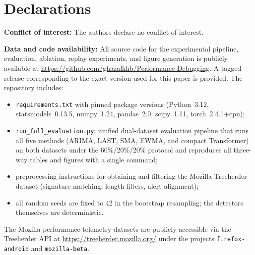 \documentclass[pdflatex,sn-nature]{sn-jnl}
\theoremstyle{thmstyleone}%
\begin{document}
\section*{Declarations}
\textbf{Conflict of interest:}
The authors declare no conflict of interest.

\noindent\textbf{Data and code availability:}
All source code for the experimental pipeline, evaluation, ablation, replay
experiments, and figure generation is publicly available at
\url{https://github.com/ghazalkhb/Performance-Debugging}.
A tagged release corresponding to the exact version used for this paper is
provided.
The repository includes:
\begin{itemize}
  \item \texttt{requirements.txt} with pinned package versions
    (Python~3.12, statsmodels~0.13.5, numpy~1.24, pandas~2.0, scipy~1.11,
     torch~2.4.1+cpu);
  \item \texttt{run\_full\_evaluation.py}: unified dual-dataset evaluation
    pipeline that runs all five methods (ARIMA, LAST, SMA, EWMA, and
    compact Transformer) on both datasets under the 60\%/20\%/20\% protocol
    and reproduces all three-way tables and figures with a single command;
  \item preprocessing instructions for obtaining and filtering the Mozilla
    Treeherder dataset (signature matching, length filters, alert alignment);
  \item all random seeds are fixed to 42 in the bootstrap resampling;
    the detectors themselves are deterministic.
\end{itemize}
The Mozilla performance-telemetry datasets are publicly accessible via the
Treeherder API at \url{https://treeherder.mozilla.org/} under the projects
\texttt{firefox-android} and \texttt{mozilla-beta}.


\end{document}
